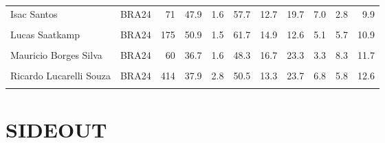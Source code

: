 \documentclass[
]{book}
\begin{document}
\begin{table}[!h]
{\begin{tabular}[t]{llrrrrrrrrr}
Isac Santos & BRA24 & 71 & 47.9 & 1.6 & 57.7 & 12.7 & 19.7 & 7.0 & 2.8 & 9.9\\
\addlinespace
\cellcolor{gray!10}{Judson Amabel Nunes Da Cunha Jr} & \cellcolor{gray!10}{BRA24} & \cellcolor{gray!10}{41} & \cellcolor{gray!10}{43.9} & \cellcolor{gray!10}{1.3} & \cellcolor{gray!10}{56.1} & \cellcolor{gray!10}{7.3} & \cellcolor{gray!10}{24.4} & \cellcolor{gray!10}{4.9} & \cellcolor{gray!10}{7.3} & \cellcolor{gray!10}{12.2}\\
Lucas Saatkamp & BRA24 & 175 & 50.9 & 1.5 & 61.7 & 14.9 & 12.6 & 5.1 & 5.7 & 10.9\\
\cellcolor{gray!10}{Lukas Felipe Bergmann} & \cellcolor{gray!10}{BRA24} & \cellcolor{gray!10}{84} & \cellcolor{gray!10}{40.5} & \cellcolor{gray!10}{2.9} & \cellcolor{gray!10}{51.2} & \cellcolor{gray!10}{16.7} & \cellcolor{gray!10}{21.4} & \cellcolor{gray!10}{0.0} & \cellcolor{gray!10}{10.7} & \cellcolor{gray!10}{10.7}\\
Mauricio Borges Silva & BRA24 & 60 & 36.7 & 1.6 & 48.3 & 16.7 & 23.3 & 3.3 & 8.3 & 11.7\\
\cellcolor{gray!10}{Otavio Henrique Rodrigues Pinto} & \cellcolor{gray!10}{BRA24} & \cellcolor{gray!10}{9} & \cellcolor{gray!10}{33.3} & \cellcolor{gray!10}{1.2} & \cellcolor{gray!10}{55.6} & \cellcolor{gray!10}{11.1} & \cellcolor{gray!10}{11.1} & \cellcolor{gray!10}{0.0} & \cellcolor{gray!10}{22.2} & \cellcolor{gray!10}{22.2}\\
\addlinespace
Ricardo Lucarelli Souza & BRA24 & 414 & 37.9 & 2.8 & 50.5 & 13.3 & 23.7 & 6.8 & 5.8 & 12.6\\
\cellcolor{gray!10}{Yoandy Leal Hidalgo} & \cellcolor{gray!10}{BRA24} & \cellcolor{gray!10}{347} & \cellcolor{gray!10}{36.3} & \cellcolor{gray!10}{3.1} & \cellcolor{gray!10}{50.1} & \cellcolor{gray!10}{11.5} & \cellcolor{gray!10}{24.5} & \cellcolor{gray!10}{7.8} & \cellcolor{gray!10}{6.1} & \cellcolor{gray!10}{13.8}\\
\bottomrule
\end{tabular}}
\end{table}

\pagebreak

\section{SIDEOUT}\label{sideout}

\begin{table}[!h]
\centering
{}
\end{table}
\end{document}
